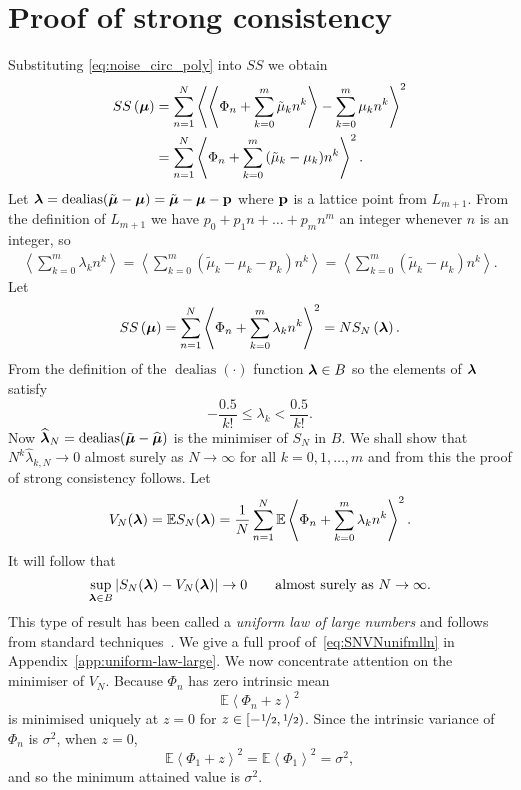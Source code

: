 \documentclass[aap,preprint]{imsart}
\newcommand{\expect}{{\mathbb E}}
\newcommand{\dealias}{\operatorname{dealias}}
\newcommand{\fracpart}[1]{\left\langle #1 \right\rangle}
\newcommand{\sabs}[1]{\vert #1 \vert}
\begin{document}
\section{Proof of strong consistency}\label{sec:strongconstproof}
 Substituting \eqref{eq:noise_circ_poly} into $SS$ we obtain
 \begin{align*}
SS\left( \mubf \right) &= \sum_{n=1}^{N}\fracpart{ \fracpart{ \Phi_n + \sum_{k = 0}^{m}{\tilde{\mu}_k n^k} } - \sum_{k = 0}^{m}{\mu_k n^k} }^{2} \\
&= \sum_{n=1}^{N}\fracpart{  \Phi_n + \sum_{k = 0}^{m}{(\tilde{\mu}_k - \mu_k) n^k} }^{2}.
\end{align*}
Let $\lambdabf = \dealias(\tilde{\mubf} - \mubf) = \tilde{\mubf} - \mubf - \pbf$ where $\mathbf{p}$ is a lattice point from $L_{m+1}$. From the definition of $L_{m+1}$ we have $p_0 + p_1 n + \dots + p_{m} n^m$ an integer whenever $n$ is an integer, so
\begin{align*}
\fracpart{\sum_{k=0}^{m}\lambda_k n^k } = \fracpart{\sum_{k=0}^{m}(\tilde{\mu}_k - \mu_k - p_k) n^k } = \fracpart{\sum_{k=0}^{m}(\tilde{\mu}_k - \mu_k) n^k }.
\end{align*}
Let
\[
SS\left( \mubf \right) = \sum_{n=1}^{N}\fracpart{  \Phi_n + \sum_{k = 0}^{m}{\lambda_k n^k} }  ^{2} = N S_{N}\left( \lambdabf \right).
 \]
From the definition of the $\dealias(\cdot)$ function $\boldsymbol{\lambda} \in B$ so the elements of $\boldsymbol{\lambda}$ satisfy
 \begin{equation} \label{eq:identifiability}
 -\frac{0.5}{k!} \leq \lambda_k < \frac{0.5}{k!}.
 \end{equation} 
Now $\widehat{\lambdabf}_N = \dealias(\tilde{\mubf} - \widehat{\mubf})$ is the minimiser of $S_{N}$ in $B$. We shall show that $N^k\widehat{\lambda}_{k,N}\rightarrow0$ almost surely as $N\rightarrow\infty$ for all $k = 0,1, \dots, m$ and from this the proof of strong consistency follows.  Let
\[
V_N(\lambdabf) =  \expect S_N(\lambdabf) = \frac{1}{N}\sum_{n=1}^{N} \expect \fracpart{  \Phi_{n}+\sum_{k = 0}^{m}{\lambda_k n^k}}  ^{2}.
\]
It will follow that
 \begin{equation}\label{eq:SNVNunifmlln}
\sup_{\lambdabf \in B}\sabs{S_N(\lambdabf) - V_N(\lambdabf)} \rightarrow 0 \qquad \text{almost surely as $N\rightarrow\infty$}.  
 \end{equation}
This type of result has been called a \emph{uniform law of large numbers} and follows from standard techniques~\cite{Pollard_conv_stat_proc_1984}.  We give a full proof of~\eqref{eq:SNVNunifmlln} in Appendix~\ref{app:uniform-law-large}.  We now concentrate attention on the minimiser of $V_N$. Because $\Phi_n$ has zero intrinsic mean 
\begin{equation}\label{eq:Efracpartmined}
\expect \fracpart{ \Phi_n + z }^{2}
\end{equation}
is minimised uniquely at $z = 0$ for $z \in [-\nicefrac{1}{2}, \nicefrac{1}{2})$.  Since the intrinsic variance of $\Phi_n$ is $\sigma^2$, when $z = 0$,
\begin{equation}\label{eq:Efracpartphi}
\expect\fracpart{\Phi_1+z}^{2} = \expect\fracpart{\Phi_1}^{2} = \sigma^2,
\end{equation}
and so the minimum attained value is $\sigma^2$.
\end{document}
